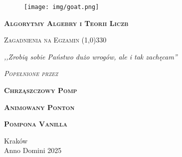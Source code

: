 \begin{titlepage} 
    \begin{center}
         \begin{figure}[h]
            \centering
            \texttt{[image: img/goat.png]}
        \end{figure}
        
        \Huge
        \textbf{\textsc{Algorytmy Algebry i Teorii Liczb}}
        
        \vspace{0.5cm}
        \Large
        \textsc{Zagadnienia na Egzamin}
        \line(1,0){330}
        
        \normalsize
        
        \vspace{1cm}
        \textit{,,Zrobią sobie Państwo dużo wrogów, ale i tak zachęcam''}
        \vspace{1cm}

        \textit{\textsc{Popełnione przez}}\\
        \vspace{5mm}
  
        \textbf{\textsc{Chrząszczowy Pomp}}
  
        \textbf{\textsc{Animowany Ponton}}
        
        \textbf{\textsc{Pompona Vanilla}}
 
        \vfill

        Kraków \\
        Anno Domini 2025
    \end{center}
\end{titlepage}